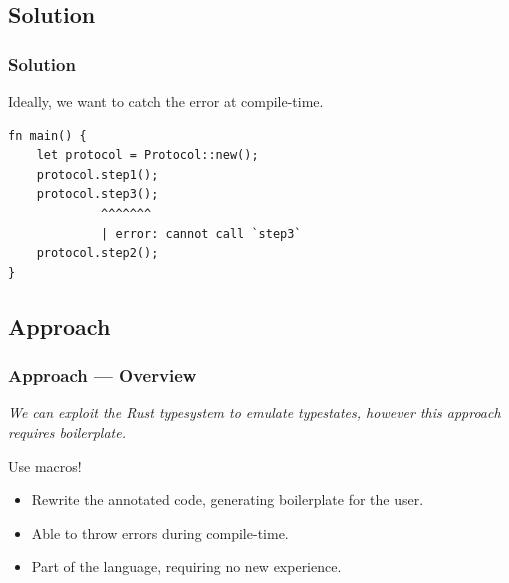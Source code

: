 \documentclass[bigger,notes,aspectratio=169]{beamer}
\begin{document}
\subsection{Solution}
\begin{frame}[fragile]
    \frametitle{Solution}
    Ideally, we want to catch the error at compile-time.
    \begin{listing}
        \centering
        \begin{verbatim}
fn main() {
    let protocol = Protocol::new();
    protocol.step1();
    protocol.step3();
             ^^^^^^^
             | error: cannot call `step3`
    protocol.step2();
}
        \end{verbatim}
    \end{listing}

\end{frame}

\subsection{Approach}
\begin{frame}
    \frametitle{Approach --- Overview}

    \emph{We can exploit the Rust typesystem to emulate typestates,
        however this approach requires boilerplate.}

    Use macros!
    \begin{itemize}
        \item Rewrite the annotated code, generating boilerplate for the user.
        \item Able to throw errors during compile-time.
        \item Part of the language, requiring no new experience.
    \end{itemize}

\end{frame}
\end{document}
